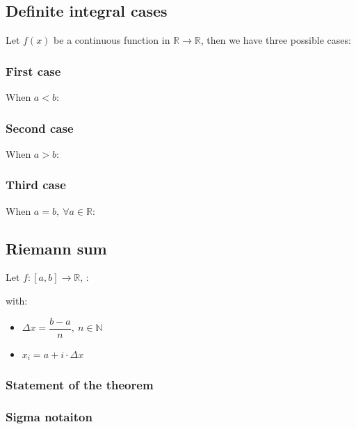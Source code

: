 \documentclass{article}
\begin{document}
\subsection{Definite integral cases}
Let $f(x)$ be a continuous function in $\mathbb{R} \to \mathbb{R}$, then
we have three possible cases:

\subsubsection{First case}
When $a<b$:

\subsubsection{Second case}
When $a>b$:
\figbox{$\integral[a][b][f(x)][x] = -\integral[b][a][f(x)][x]$}

\subsubsection{Third case}
When $a=b,\ \forall a \in \mathbb{R}$:

\subsection{Riemann sum}
Let $f: [a,b] \to \mathbb{R}$, :

with:
\begin{itemize}
    \item $\Delta x = \dfrac{b-a}{n},\ n \in \mathbb{N}$
    \item $x_i = a + i \cdot \Delta x$
\end{itemize}


\subsubsection{Statement of the theorem}

\subsubsection{Sigma notaiton}
\end{document}
